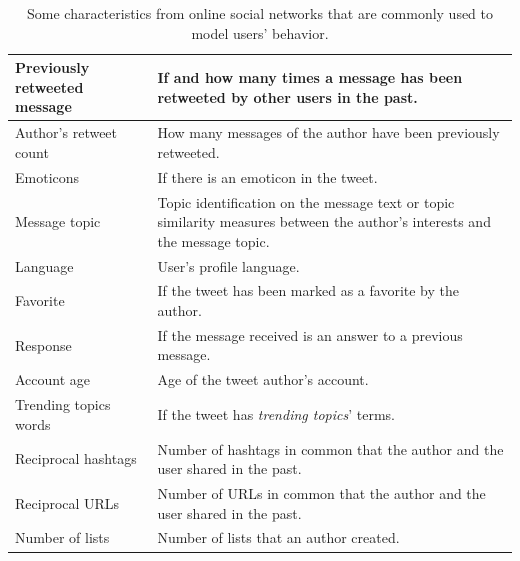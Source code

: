 \begin{table}[htbp]
\begin{tabular}{|>{\raggedright\centering\arraybackslash}m{4cm}|m{11cm}|}
		Previously retweeted message 												& If and how many times a message has been retweeted by other users in the past. \cite{Hong2011,Suh2010} \\ \hline
		Author's retweet count 															& How many messages of the author have been previously retweeted. \cite{Hong2011,Peng2011} \\ \hline
		Emoticons					 												& If there is an emoticon in the tweet. \cite{Liu2013} \\ \hline
		Message topic 																			& Topic identification on the message text or topic similarity measures between the author's interests and the message topic. \cite{Liu2013,Luo2013,Peng2011,Wang2012} \\ \hline
		Language 																						& User's profile language. \cite{Petrovic2011,Wang2012} \\ \hline
		Favorite 																						& If the tweet has been marked as a favorite by the author. \cite{Petrovic2011,Suh2010} \\ \hline
		Response 																						& If the message received is an answer to a previous message. \cite{Petrovic2011} \\ \hline
		Account age 																				& Age of the tweet author's account. \cite{Suh2010,Wang2012} \\ \hline
		Trending topics words 															& If the tweet has \textit{trending topics}' terms. \cite{Petrovic2011} \\ \hline
		Reciprocal hashtags 																& Number of hashtags in common that the author and the user shared in the past. \cite{Wang2012} \\ \hline
		Reciprocal URLs																			& Number of URLs in common that the author and the user shared in the past. \cite{Wang2012} \\ \hline
		Number of lists																			& Number of lists that an author created. \cite{Wang2012} \\ \hline
	\end{tabular}
	\caption{Some characteristics from online social networks that are commonly used to model users' behavior.} 
	\label{tab:characteristics}
\end{table}

